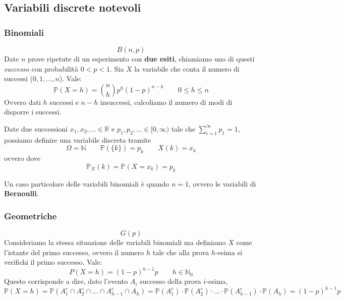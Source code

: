 \subsection{Variabili discrete notevoli}
\subsubsection{Binomiali}
\begin{equation}
	B(n,p)
\end{equation}
Date $n$ prove ripetute di un esperimento con \textbf{due esiti}, chiamiamo uno di questi \textit{successo} con probabilità $0 < p < 1$. Sia $X$ la variabile che conta il numero di successi ($0, 1, \ldots,n$). Vale:
\begin{equation}
	\mathbb{P}(X=h)=\binom{n}{h}p^h(1-p)^{n-h} \quad\quad 0 \leq h \leq n
\end{equation}
Ovvero dati $h$ successi e $n-h$ insuccessi, calcoliamo il numero di modi di disporre i successi.

\begin{observation}
	Date due successioni $x_1,x_2, \ldots \in \mathbb{R}$ e $p_1, p_2, \ldots \in [0, \infty)$ tale che $\sum_{i=1}^{\infty}p_1 = 1$, possiamo definire una variabile discreta tramite
	\begin{equation}
		\Omega = \mathbb{N} \quad\quad \mathbb{P}(\{k\})=p_k \quad\quad X(k) = x_k
	\end{equation}
	ovvero dove
	\begin{equation*}
		\mathbb{P}_X(k) = \mathbb{P}(X = x_k) = p_k
	\end{equation*}
\end{observation}
Un caso particolare delle variabili binomiali è quando $n=1$, ovvero le variabili di \textbf{Bernoulli}.

\subsubsection{Geometriche}
\begin{equation}
	G(p)
\end{equation}
Consideriamo la stessa situazione delle variabili binomiali ma definiamo $X$ come l'istante del primo successo, ovvero il numero $h$ tale che alla prova $h$-esima si verifichi il primo successo. Vale:
\begin{equation}
	P(X=h)=(1-p)^{h-1}p \quad\quad h \in \mathbb{N}_0
\end{equation}
Questo corrisponde a dire, dato l'evento $A_i$ successo della prova $i$-esima,
\begin{equation*}
	\mathbb{P}(X=h) = \mathbb{P}(A^c_1 \cap A^c_2 \cap \ldots \cap A^c_{h-1} \cap A_h) = \mathbb{P}(A^c_1) \cdot \mathbb{P}(A^c_2) \cdot \ldots \cdot \mathbb{P}(A^c_{h-1}) \cdot \mathbb{P}(A_h) = (1-p)^{h-1}p
\end{equation*} 

